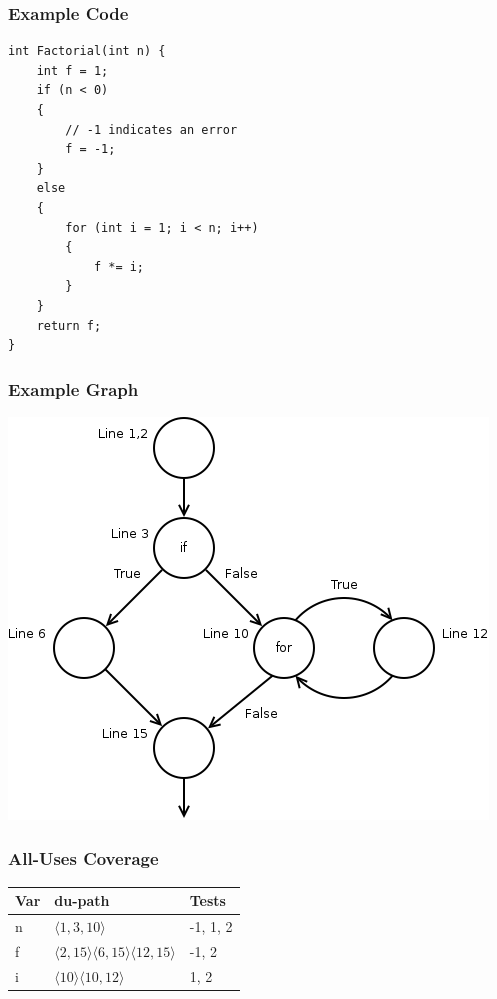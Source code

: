 \begin{frame}[fragile]
    \frametitle{Example Code}
    \begin{verbatim}
int Factorial(int n) {
    int f = 1;
    if (n < 0)
    {
        // -1 indicates an error
        f = -1;
    }
    else
    {
        for (int i = 1; i < n; i++)
        {
            f *= i;
        }
    }
    return f;
}
    \end{verbatim}
\end{frame}

\begin{frame}
    \frametitle{Example Graph}
    \centering
    \includegraphics[scale=0.4]{state_transition.png}
\end{frame}

\begin{frame}
    \frametitle{All-Uses Coverage}
    \centering
    \begin{tabular}{ l l l }
        Var & du-path & Tests\\ \hline
        n & $\langle1, 3, 10\rangle$ & -1, 1, 2\\
        f & $\langle2, 15\rangle \langle6, 15\rangle \langle12, 15\rangle$ & -1, 2\\
        i & $\langle10\rangle \langle10, 12\rangle$ & 1, 2
    \end{tabular}
\end{frame}


